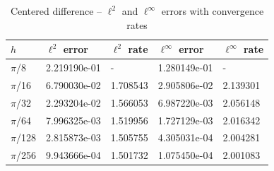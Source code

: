 \documentclass{homework}
\begin{document}
\begin{alphaparts}
		\begin{table}[h]
			\centering
			\begin{tabular}{@{}lllll@{}}
				\toprule
				$h$ & $\ell^2$ error & $\ell^2$ rate & $\ell^\infty$ error & $\ell^\infty$ rate \\
				\midrule
				$\pi$/8 & 2.219190e-01 & - & 1.280149e-01 & -\\
				$\pi$/16 & 6.790030e-02 & 1.708543 & 2.905806e-02 & 2.139301\\
				$\pi$/32 & 2.293204e-02 & 1.566053 & 6.987220e-03 & 2.056148\\
				$\pi$/64 & 7.996325e-03 & 1.519956 & 1.727129e-03 & 2.016342\\
				$\pi$/128 & 2.815873e-03 & 1.505755 & 4.305031e-04 & 2.004281\\
				$\pi$/256 & 9.943666e-04 & 1.501732 & 1.075450e-04 & 2.001083\\
				\bottomrule
			\end{tabular}
			\caption{Centered difference -- $\ell^2$ and $\ell^\infty$ errors with convergence rates}
			\label{tab:p2b}
		\end{table}
		

\end{alphaparts}
\end{document}
